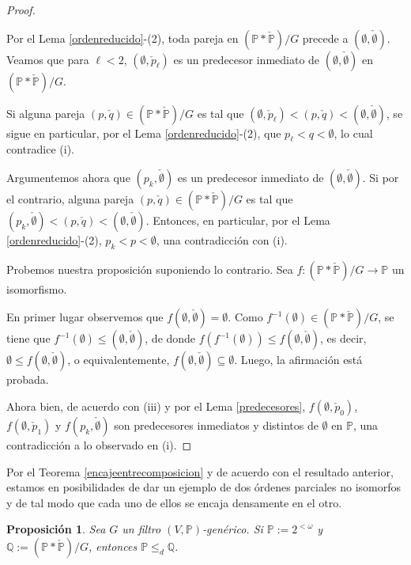 \documentclass[11pt]{unam_tesis1}
\theoremstyle{MyThmStyle}
\theoremstyle{definition}
\theoremstyle{plain}
\newtheorem{proposition}[definition]{Proposici\'on}
\theoremstyle{remark}
\let\leq\leqslant
\begin{document}
\begin{proof}
\begin{itemize}
Por el Lema \ref{ordenreducido}-(2), toda pareja en $(\mathbb P*\check{\mathbb P})/G$ precede a $(\emptyset, \check{\emptyset})$. Veamos que para $\ell<2$, $(\emptyset, \check p_\ell)$ es un predecesor inmediato de $(\emptyset, \check{\emptyset})$ en $(\mathbb P*\check{\mathbb P})/G$. 

Si alguna pareja $(p,\check{q})\in (\mathbb P*\check{\mathbb P})/G$ es tal que $(\emptyset,\check p_\ell)< (p,\check{q})< (\emptyset, \check{\emptyset})$, se sigue en particular, por el Lema \ref{ordenreducido}-(2), que $p_\ell < q < \emptyset$, lo cual contradice (i). 

Argumentemos ahora que $(p_k,\check{\emptyset})$ es un predecesor inmediato de $(\emptyset,\check{\emptyset})$. Si por el contrario, alguna pareja $(p,\check{q})\in (\mathbb P*\check{\mathbb P})/G$ es tal que $(p_k,\check{\emptyset})< (p,\check{q})< (\emptyset, \check{\emptyset})$. Entonces, en particular, por el Lema \ref{ordenreducido}-(2), $p_k< p < \emptyset$, una contradicci\'on con (i).

\end{itemize}

Probemos nuestra proposici\'on suponiendo lo contrario. Sea $f:(\mathbb P*\check {\mathbb P})/G \to \mathbb P$ un isomorfismo. 

En primer lugar observemos que $f(\emptyset,\check{\emptyset})=\emptyset$. Como $f^{-1}(\emptyset)\in (\mathbb P*\check{\mathbb P})/G$, se tiene que $f^{-1}(\emptyset)\leq (\emptyset,\check{\emptyset})$, de donde $f(f^{-1}(\emptyset))\leq f(\emptyset,\check{\emptyset})$, es decir, $\emptyset\leq f(\emptyset,\check{\emptyset})$, o equivalentemente, $f(\emptyset,\check\emptyset) \subseteq \emptyset$. Luego, la afirmaci\'on est\'a probada.

Ahora bien, de acuerdo con (iii) y por el Lema \ref{predecesores}, $f(\emptyset,\check{p}_0)$, $f(\emptyset, \check p_1)$ y $f(p_k,\check{\emptyset})$ son predecesores inmediatos y distintos de $\emptyset$ en $\mathbb P$, una contradicci\'on a lo observado en (i).
\end{proof}

Por el Teorema \ref{encajeentrecomposicion} y de acuerdo con el resultado anterior, estamos en posibilidades de dar un ejemplo de dos \'ordenes parciales no isomorfos y de tal modo que cada uno de ellos se encaja densamente en el otro.

\begin{proposition}

Sea $G$ un filtro $(V,\mathbb P)$-gen\'erico. Si $\mathbb P:=2^{<\omega}$ y $\mathbb Q:=(\mathbb P*\check{\mathbb P})/G$, entonces $\mathbb P\leq_d \mathbb Q$.

\end{proposition}
\end{document}
